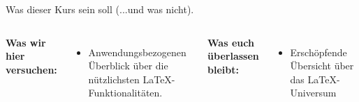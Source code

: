 \begin{frame}[c]{Was dieser Kurs sein soll (...und was nicht).}

  \begin{columns}[t]
    \textbf{Was wir hier versuchen:}
    \begin{itemize}
    \item<1-> \alert{Anwendungsbezogenen} Überblick über die nützlichsten \LaTeX-Funktionalitäten.
    \end{itemize}
    \textbf{Was euch überlassen bleibt:}
    \begin{itemize}
    \item<1-> Erschöpfende Übersicht über das \LaTeX-Universum
    \end{itemize}
  \end{columns}
  
\end{frame}